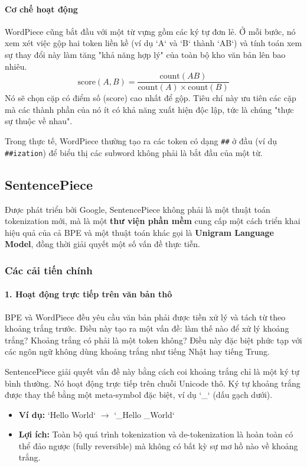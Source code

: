 \paragraph{Cơ chế hoạt động}
WordPiece cũng bắt đầu với một từ vựng gồm các ký tự đơn lẻ. Ở mỗi bước, nó xem xét việc gộp hai token liền kề (ví dụ `A` và `B` thành `AB`) và tính toán xem sự thay đổi này làm tăng "khả năng hợp lý" của toàn bộ kho văn bản lên bao nhiêu.
$$ \text{score}(A, B) = \frac{\text{count}(AB)}{\text{count}(A) \times \text{count}(B)} $$
Nó sẽ chọn cặp có điểm số (score) cao nhất để gộp. Tiêu chí này ưu tiên các cặp mà các thành phần của nó ít có khả năng xuất hiện độc lập, tức là chúng "thực sự thuộc về nhau".

Trong thực tế, WordPiece thường tạo ra các token có dạng \texttt{\#\#} ở đầu (ví dụ \texttt{\#\#ization}) để biểu thị các subword không phải là bắt đầu của một từ.

\subsection{SentencePiece}
\label{ssec:sentencepiece}

Được phát triển bởi Google, SentencePiece \cite{kudo2018sentencepiece} không phải là một thuật toán tokenization mới, mà là một \textbf{thư viện phần mềm} cung cấp một cách triển khai hiệu quả của cả BPE và một thuật toán khác gọi là \textbf{Unigram Language Model}, đồng thời giải quyết một số vấn đề thực tiễn.

\subsubsection{Các cải tiến chính}
\paragraph{1. Hoạt động trực tiếp trên văn bản thô}
BPE và WordPiece đều yêu cầu văn bản phải được tiền xử lý và tách từ theo khoảng trắng trước. Điều này tạo ra một vấn đề: làm thế nào để xử lý khoảng trắng? Khoảng trắng có phải là một token không? Điều này đặc biệt phức tạp với các ngôn ngữ không dùng khoảng trắng như tiếng Nhật hay tiếng Trung.

SentencePiece giải quyết vấn đề này bằng cách coi khoảng trắng chỉ là một ký tự bình thường. Nó hoạt động trực tiếp trên chuỗi Unicode thô. Ký tự khoảng trắng được thay thế bằng một meta-symbol đặc biệt, ví dụ `\_` (dấu gạch dưới).
\begin{itemize}
    \item \textbf{Ví dụ:} `Hello World` $\rightarrow$ `\_Hello \_World`
    \item \textbf{Lợi ích:} Toàn bộ quá trình tokenization và de-tokenization là hoàn toàn có thể đảo ngược (fully reversible) mà không có bất kỳ sự mơ hồ nào về khoảng trắng.
\end{itemize}

